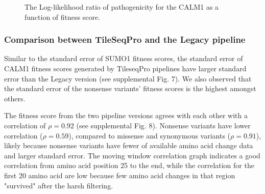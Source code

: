 \documentclass{article}
\begin{document}
\begin{figure}[H]%
    \centering
    \qquad
    \caption{The Log-likelihood ratio of pathogenicity for the CALM1 as a function of fitness score.}%
    \label{fig:LLR CALM1}%
\end{figure}


\subsubsection{Comparison between TileSeqPro and the Legacy pipeline}
Similar to the standard error of SUMO1 fitness scores, the standard error of CALM1 fitness scores generated by TileseqPro pipelines have larger standard error than the Legacy version (see supplemental Fig. 7). We also observed that the standard error of the nonsense variants' fitness scores is the highest amongst others.


The fitness score from the two pipeline versions agrees with each other with a correlation of $\rho = 0.92$ (see supplemental Fig. 8). Nonsense variants have lower correlation ($\rho = 0.59$), compared to missense and synonymous variants ($\rho = 0.91$), likely because nonsense variants have fewer of available amino acid change data and larger standard error. The moving window correlation graph indicates a good correlation from amino acid position 25 to the end, while the correlation for the first 20 amino acid are low because few amino acid changes in that region "survived" after the harsh filtering.
\end{document}
